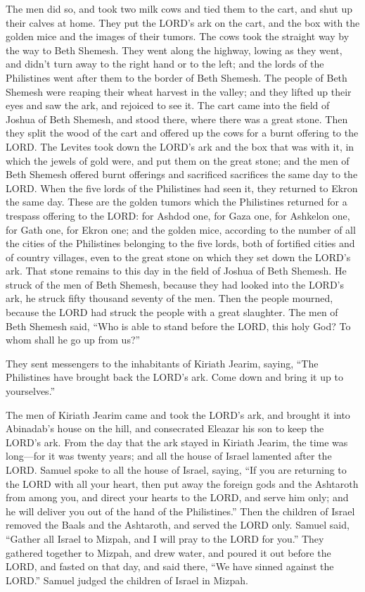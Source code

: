 \myverse{}The men did so, and took two milk cows and tied them to the cart,
and shut up their calves at home.
\myverse{}They put the LORD’s ark on the cart, and the box with the golden mice and
the images of their tumors.
\myverse{}The cows took the straight way by the way to Beth Shemesh. They went along
the highway, lowing as they went, and didn’t turn away to the right hand or to the left; and the lords
of the Philistines went after them to the border of Beth Shemesh.
\myverse{}The people of Beth Shemesh were reaping their wheat harvest in the valley;
and they lifted up their eyes and saw the ark, and rejoiced to see it.
\myverse{}The cart came into the field of Joshua of Beth Shemesh, and stood there, where
there was a great stone. Then they split the wood of the cart and offered up the cows for a burnt offering
to the LORD.
\myverse{}The Levites took down the LORD’s ark and the box that was with it, in which
the jewels of gold were, and put them on the great stone; and the men of Beth Shemesh offered burnt offerings
and sacrificed sacrifices the same day to the LORD.
\myverse{}When the five lords of the Philistines had seen it, they returned to Ekron
the same day.
\myverse{}These are the golden tumors which the Philistines returned for a trespass
offering to the LORD: for Ashdod one, for Gaza one, for Ashkelon one, for Gath one, for Ekron one;
\myverse{}and the golden mice, according to the number of all the cities of the Philistines
belonging to the five lords, both of fortified cities and of country villages, even to the great stone
on which they set down the LORD’s ark. That stone remains to this day in the field of Joshua of Beth Shemesh.
\myverse{}He struck of the men of Beth Shemesh, because they had looked into the LORD’s
ark, he struck fifty thousand seventy of the men. Then the people mourned, because the LORD had struck
the people with a great slaughter.
\myverse{}The men of Beth Shemesh said, “Who is able to stand before the LORD, this
holy God? To whom shall he go up from us?”

\myverse{}They sent messengers to the inhabitants of Kiriath Jearim, saying,
“The Philistines have brought back the LORD’s ark. Come down and bring it up to yourselves.”


\mychapter{} \myverse*{}The men of Kiriath Jearim came and took the LORD’s ark, and brought
it into Abinadab’s house on the hill, and consecrated Eleazar his son to keep the LORD’s ark.
\myverse{}From the day that the ark stayed in Kiriath Jearim, the time was long—for it
was twenty years; and all the house of Israel lamented after the LORD.
\myverse{}Samuel spoke to all the house of Israel, saying, “If you are returning to the
LORD with all your heart, then put away the foreign gods and the Ashtaroth from among you, and direct
your hearts to the LORD, and serve him only; and he will deliver you out of the hand of the Philistines.”
\myverse{}Then the children of Israel removed the Baals and the Ashtaroth, and served
the LORD only.
\myverse{}Samuel said, “Gather all Israel to Mizpah, and I will pray to the LORD for you.”
\myverse{}They gathered together to Mizpah, and drew water, and poured it out before the
LORD, and fasted on that day, and said there, “We have sinned against the LORD.” Samuel judged the children
of Israel in Mizpah.

